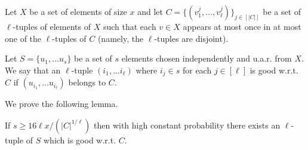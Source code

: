 Let $X$ be a set of elements of size $x$ and let $C=\{(v^j_1, \ldots, v^j_\ell)\}_{j\in [|C|]}$ be a set of $\ell$-tuples of elements of $X$ such that each $v\in X$ appears at most once in at most one of the $\ell$-tuples of $C$ (namely, the $\ell$-tuples are disjoint).

Let $S = \{u_1, \ldots u_s\}$ be a set of $s$ elements chosen independently and u.a.r. from $X$. We say that an $\ell$-tuple $(i_1, \ldots i_\ell)$ where $i_j \in s$ for each $j\in [\ell]$ is good w.r.t. $C$ if $(u_{i_1}, \ldots u_{i_\ell})$ belongs to $C$.

We prove the following lemma.

\begin{claim}\label{clm:ver-num}
If $s \geq 16 \ell x / (|C|^{1/\ell})$ then with high constant probability there exists an $\ell$-tuple of $S$ which is good w.r.t. $C$.
\end{claim}

